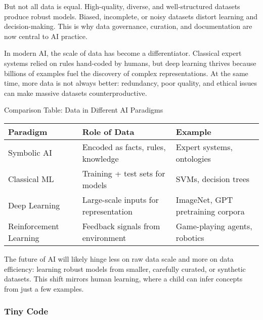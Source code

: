 \documentclass[
  letterpaper,
  DIV=11,
  numbers=noendperiod]{scrreprt}
\begin{document}
But not all data is equal. High-quality, diverse, and well-structured
datasets produce robust models. Biased, incomplete, or noisy datasets
distort learning and decision-making. This is why data governance,
curation, and documentation are now central to AI practice.

In modern AI, the scale of data has become a differentiator. Classical
expert systems relied on rules hand-coded by humans, but deep learning
thrives because billions of examples fuel the discovery of complex
representations. At the same time, more data is not always better:
redundancy, poor quality, and ethical issues can make massive datasets
counterproductive.

Comparison Table: Data in Different AI Paradigms

\begin{longtable}[]{@{}
  >{\raggedright\arraybackslash}p{}
  >{\raggedright\arraybackslash}p{}
  >{\raggedright\arraybackslash}p{}@{}}
\toprule\noalign{}
\begin{minipage}[b]{\linewidth}\raggedright
Paradigm
\end{minipage} & \begin{minipage}[b]{\linewidth}\raggedright
Role of Data
\end{minipage} & \begin{minipage}[b]{\linewidth}\raggedright
Example
\end{minipage} \\
\midrule\noalign{}
\endhead
\bottomrule\noalign{}
\endlastfoot
Symbolic AI & Encoded as facts, rules, knowledge & Expert systems,
ontologies \\
Classical ML & Training + test sets for models & SVMs, decision trees \\
Deep Learning & Large-scale inputs for representation & ImageNet, GPT
pretraining corpora \\
Reinforcement Learning & Feedback signals from environment &
Game-playing agents, robotics \\
\end{longtable}

The future of AI will likely hinge less on raw data scale and more on
data efficiency: learning robust models from smaller, carefully curated,
or synthetic datasets. This shift mirrors human learning, where a child
can infer concepts from just a few examples.

\subsubsection{Tiny Code}\label{tiny-code-70}
\end{document}
